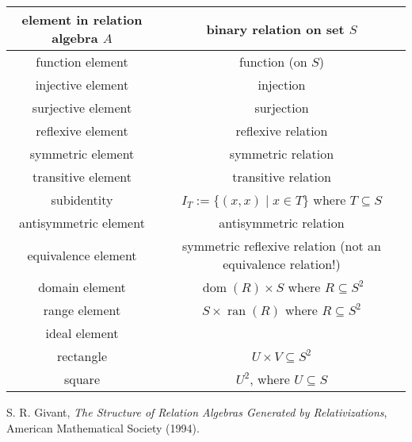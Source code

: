 \documentclass[12pt]{article}
\begin{document}
\begin{center}
\begin{tabular}{|c|c|}
\hline
element in relation algebra $A$ & binary relation on set $S$ \\
\hline\hline
function element & function (on $S$) \\
\hline
injective element & injection \\
\hline
surjective element & surjection \\
\hline
reflexive element & reflexive relation \\
\hline
symmetric element & symmetric relation \\
\hline
transitive element & transitive relation \\
\hline
subidentity & $I_T:=\lbrace (x,x)\mid x\in T\rbrace$ where $T\subseteq S$ \\
\hline
antisymmetric element & antisymmetric relation \\
\hline
equivalence element & symmetric reflexive relation (not an equivalence relation!) \\
\hline
domain element & $\operatorname{dom}(R)\times S$ where $R\subseteq S^2$ \\
\hline
range element & $S\times \operatorname{ran}(R)$ where $R\subseteq S^2$ \\
\hline
ideal element &  \\
\hline
rectangle & $U\times V\subseteq S^2$ \\
\hline
square & $U^2$, where $U\subseteq S$ \\
\hline
\end{tabular}
\end{center}

\begin{thebibliography}{8}
 S. R. Givant, \emph{The Structure of Relation Algebras Generated by Relativizations}, American Mathematical Society (1994).
\end{thebibliography}
\end{document}
